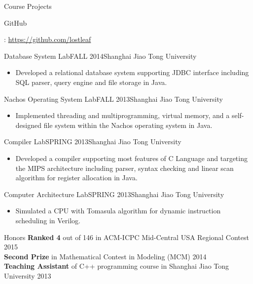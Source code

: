 \documentclass{resume} %
\begin{document}
\begin{rSection}{Course Projects}{\begin{bf}GitHub\end{bf}: \href{https://github.com/lostleaf?tab=repositories}{https://github.com/lostleaf}}

\begin{rSubsection}{Database System Lab}{FALL 2014}{Shanghai Jiao Tong University}
\begin{itemize}
\item Developed a relational database system supporting JDBC interface including SQL parser, query engine and file storage in Java.
\end{itemize}
\end{rSubsection}
\vspace{3pt}
\begin{rSubsection}{Nachos Operating System Lab}{FALL 2013}{Shanghai Jiao Tong University}
\begin{itemize}
\item Implemented threading and multiprogramming, virtual memory, and a self-designed file system within the Nachos operating system in Java.
\end{itemize}
\end{rSubsection}
\vspace{3pt}
\begin{rSubsection}{Compiler Lab}{SPRING 2013}{Shanghai Jiao Tong University}
\begin{itemize}
\item Developed a compiler supporting most features of C Language and targeting the MIPS architecture including parser, syntax checking and linear scan algorithm for register allocation in Java.
\end{itemize}
\end{rSubsection}
\vspace{3pt}
\begin{rSubsection}{Computer Architecture Lab}{SPRING 2013}{Shanghai Jiao Tong University}
\begin{itemize}
\item Simulated a CPU with Tomasula algorithm for dynamic instruction scheduling in Verilog.
\end{itemize}
\end{rSubsection}

\end{rSection}


\begin{rSection}{Honors}
\textbf{Ranked 4} out of 146 in ACM-ICPC Mid-Central USA Regional Contest \hfill 2015\\
\textbf{Second Prize} in Mathematical Contest in Modeling (MCM) \hfill 2014\\
\textbf{Teaching Assistant} of C++ programming course in Shanghai Jiao Tong University \hfill 2013\\
\end{rSection}

\end{document}
